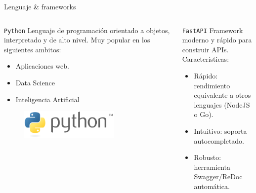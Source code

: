 \documentclass[aspectratio=169,xcolor=dvipsnames]{beamer}
\begin{document}
	
	\begin{frame}{Lenguaje \& frameworks}
		\begin{columns}
			\begin{column}{0.5\textwidth}
				\begin{exampleblock}{\texttt{Python}}
					Lenguaje de programación orientado a objetos, interpretado y de alto nivel. Muy popular en los siguientes ambitos:
					
					\begin{itemize}
						\item Aplicaciones web.
						
						\item Data Science
						
						\item Inteligencia Artificial
					\end{itemize}
					
					\begin{figure}[h!]
						\begin{center}
							\includegraphics[width=0.7\textwidth]{img/python_logo.png}
						\end{center}
					\end{figure}
				\end{exampleblock}
			\end{column}
		
			\begin{column}{0.5\textwidth}
				\begin{exampleblock}{\texttt{FastAPI}}
					Framework moderno y rápido para construir APIs. Características:
					
					\begin{itemize}
						\item Rápido: rendimiento equivalente a otros lenguajes (NodeJS o Go).
						\item Intuitivo: soporta autocompletado. 
						\item Robusto: herramienta Swagger/ReDoc automática.
					\end{itemize}
					

\end{exampleblock}
\end{column}
\end{columns}
\end{frame}
\end{document}

